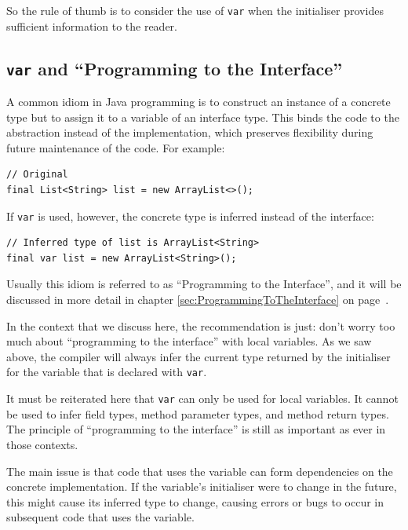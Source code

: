 \documentclass[11pt,a4paper, titlepage, parskip=half, headsepline, footsepline, cleardoublepage=current, headheight=1cm]{scrbook}
\newcommand*{\tqvref}[1]{\hyperref[{#1}]{\ref*{#1}} on page~\pageref{#1}}
\begin{document}
So the rule of thumb is to consider the use of \lstinline|var| when the initialiser provides sufficient information to the reader.


\subsection{\lstinline|var| and “Programming to the Interface”}
A common idiom in Java programming is to construct an instance of a concrete type but to assign it to a variable of an interface type. This binds the code to the abstraction instead of the implementation, which preserves flexibility during future maintenance of the code. For example:
\begin{lstlisting}
// Original
final List<String> list = new ArrayList<>();
\end{lstlisting}
If \lstinline|var| is used, however, the concrete type is inferred instead of the interface:
\begin{lstlisting}
// Inferred type of list is ArrayList<String>
final var list = new ArrayList<String>();
\end{lstlisting}

Usually this idiom is referred to as “Programming to the Interface”, and it will be discussed in more detail in chapter \tqvref{sec:ProgrammingToTheInterface}.

In the context that we discuss here, the recommendation is just: don’t worry too much about “programming to the interface” with local variables. As we saw above, the compiler will always infer the current type returned by the initialiser for the variable that is declared with \lstinline|var|.

It must be reiterated here that \lstinline|var| can only be used for local variables. It cannot be used to infer field types, method parameter types, and method return types. The principle of “programming to the interface” is still as important as ever in those contexts.

The main issue is that code that uses the variable can form dependencies on the concrete implementation. If the variable’s initialiser were to change in the future, this might cause its inferred type to change, causing errors or bugs to occur in subsequent code that uses the variable.
\end{document}
